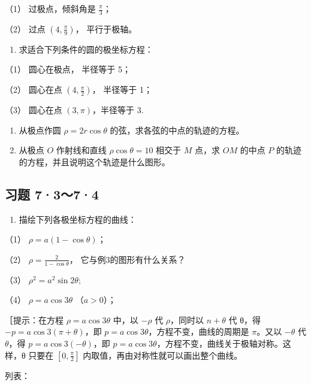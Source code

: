 （1） 过极点，倾斜角是 \(\frac{\pi}{3}\)；

（2） 过点 \(\left(4, \frac{\pi}{9}\right)\)， 平行于极轴。

\begin{enumerate}
\def\labelenumi{\arabic{enumi}.}
\setcounter{enumi}{1}
\tightlist
\item
  求适合下列条件的圆的极坐标方程：
\end{enumerate}

（1） 圆心在极点， 半径等于 5；

（2） 圆心在点 \(\left(4, \frac{\pi}{2}\right)\)， 半径等于 1；

（3） 圆心在点 \((3, \pi)\)，半径等于 3.

\begin{enumerate}
\def\labelenumi{\arabic{enumi}.}
\setcounter{enumi}{2}
\item
  从极点作圆 \(\rho = 2r\cos \theta\) 的弦，求各弦的中点的轨迹的方程。
\item
  从极点 \(O\) 作射线和直线 \(\rho \cos \theta = 10\) 相交于 \(M\)
  点，求 \(OM\) 的中点 \(P\) 的轨迹的方程，并且说明这个轨迹是什么图形。
\end{enumerate}

\subsection{习题 7·3～7·4}\label{ux4e60ux9898-7374}

\begin{enumerate}
\def\labelenumi{\arabic{enumi}.}
\tightlist
\item
  描绘下列各极坐标方程的曲线：
\end{enumerate}

（1） \(\rho = a(1 - \cos \theta)\)；

（2） \(\rho = \frac{2}{1 - \cos\theta}\)， 它与例3的图形有什么关系？

（3） \(\rho^2 = a^2\sin 2\theta;\)

（4） \(\rho = a\cos 3\theta\) （\(a > 0\)）；

［提示：在方程 \(\rho = a\cos 3\theta\) 中，以 \(-\rho\) 代
\(\rho\)，同时以 \(n + \theta\) 代 θ，得 \(-p=a\cos3(\pi+\theta)\)，即
\(p=a\cos3\theta\)，方程不变，曲线的周期是 \(\pi\)。又以 \(-\theta\) 代
\(\theta\)，得 \(p=a\cos3(-\theta)\)，即
\(p=a\cos3\theta\)，方程不变，曲线关于极轴对称。这样，θ 只要在
\(\left[0,\frac{\pi}{2}\right]\) 内取值，再由对称性就可以画出整个曲线。

列表：

